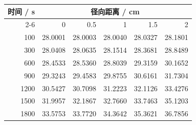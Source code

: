 \begin{tabular}{rrrrrr}
\toprule
时间 / s & \multicolumn{5}{c}{径向距离 / cm} \\
\cmidrule(lr){2-6}
 & 0 & 0.5 & 1 & 1.5 & 2 \\
\midrule
100 & 28.0001 & 28.0003 & 28.0040 & 28.0327 & 28.1801 \\
300 & 28.0408 & 28.0635 & 28.1514 & 28.3681 & 28.8489 \\
600 & 28.4533 & 28.5360 & 28.8039 & 29.3159 & 30.1652 \\
900 & 29.3243 & 29.4583 & 29.8755 & 30.6161 & 31.7304 \\
1200 & 30.5427 & 30.7098 & 31.2223 & 32.1126 & 33.4276 \\
1500 & 31.9957 & 32.1867 & 32.7660 & 33.7463 & 35.1203 \\
1800 & 33.5753 & 33.7720 & 34.3642 & 35.3621 & 36.7856 \\
\bottomrule
\end{tabular}
